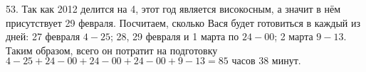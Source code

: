 53. Так как 2012 делится на 4, этот год является високосным, а значит в нём присутствует 29 февраля. Посчитаем, сколько Вася будет готовиться в каждый из дней: 27 февраля $4-25$; 28, 29 февраля и 1 марта по $24-00$; 2 марта $9-13.$ Таким образом, всего он потратит на подготовку $4-25+24-00+24-00+24-00+9-13=85\text{ часов }38\text{ минут.}$\\
